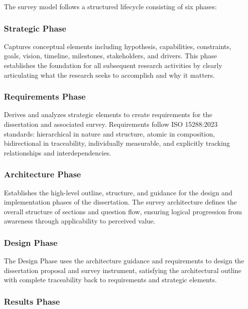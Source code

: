 The survey model follows a structured lifecycle consisting of six phases:

\subsubsection{Strategic Phase}

Captures conceptual elements including hypothesis, capabilities, constraints, goals, vision, timeline, milestones, stakeholders, and drivers. This phase establishes the foundation for all subsequent research activities by clearly articulating what the research seeks to accomplish and why it matters.

\subsubsection{Requirements Phase}

Derives and analyzes strategic elements to create requirements for the dissertation and associated survey. Requirements follow ISO 15288:2023 standards: hierarchical in nature and structure, atomic in composition, bidirectional in traceability, individually measurable, and explicitly tracking relationships and interdependencies.

\subsubsection{Architecture Phase}

Establishes the high-level outline, structure, and guidance for the design and implementation phases of the dissertation. The survey architecture defines the overall structure of sections and question flow, ensuring logical progression from awareness through applicability to perceived value.

\subsubsection{Design Phase}

The Design Phase uses the architecture guidance and requirements to design the dissertation proposal and survey instrument, satisfying the architectural outline with complete traceability back to requirements and strategic elements.

\subsubsection{Results Phase}

